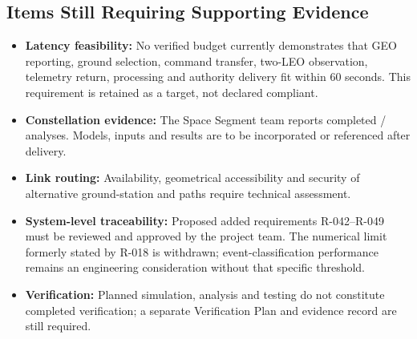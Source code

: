 \subsection{Items Still Requiring Supporting Evidence}
\begin{itemize}
  \item \textbf{Latency feasibility:} No verified budget currently demonstrates that GEO reporting, ground selection, command transfer, two-LEO observation, telemetry return, processing and authority delivery fit within 60 seconds. This requirement is retained as a target, not declared compliant.
  \item \textbf{Constellation evidence:} The Space Segment team reports completed / analyses. Models, inputs and results are to be incorporated or referenced after delivery.
  \item \textbf{Link routing:} Availability, geometrical accessibility and security of alternative ground-station and  paths require technical assessment.
  \item \textbf{System-level traceability:} Proposed added requirements R-042--R-049 must be reviewed and approved by the project team. The numerical limit formerly stated by R-018 is withdrawn; event-classification performance remains an engineering consideration without that specific threshold.
  \item \textbf{Verification:} Planned simulation, analysis and testing do not constitute completed verification; a separate Verification Plan and evidence record are still required.
\end{itemize}
